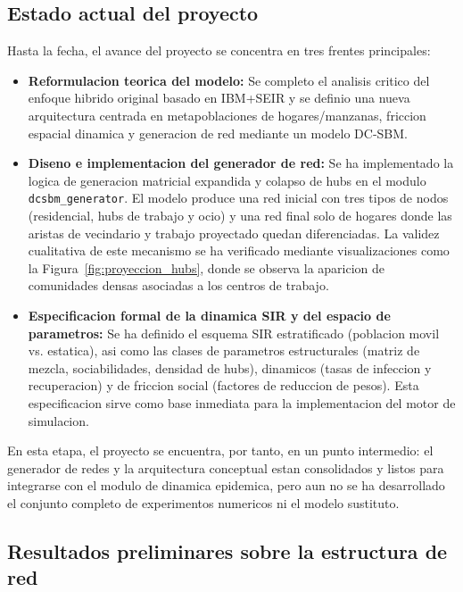 \subsection{Estado actual del proyecto}

Hasta la fecha, el avance del proyecto se concentra en tres frentes principales:

\begin{itemize}
    \item \textbf{Reformulacion teorica del modelo:} Se completo el analisis critico del enfoque hibrido original basado en IBM+SEIR y se definio una nueva arquitectura centrada en metapoblaciones de hogares/manzanas, friccion espacial dinamica y generacion de red mediante un modelo DC-SBM.
    \item \textbf{Diseno e implementacion del generador de red:} Se ha implementado la logica de generacion matricial expandida y colapso de hubs en el modulo \texttt{dcsbm\_generator}. El modelo produce una red inicial con tres tipos de nodos (residencial, hubs de trabajo y ocio) y una red final solo de hogares donde las aristas de vecindario y trabajo proyectado quedan diferenciadas. La validez cualitativa de este mecanismo se ha verificado mediante visualizaciones como la Figura~\ref{fig:proyeccion_hubs}, donde se observa la aparicion de comunidades densas asociadas a los centros de trabajo.
    \item \textbf{Especificacion formal de la dinamica SIR y del espacio de parametros:} Se ha definido el esquema SIR estratificado (poblacion movil vs. estatica), asi como las clases de parametros estructurales (matriz de mezcla, sociabilidades, densidad de hubs), dinamicos (tasas de infeccion y recuperacion) y de friccion social (factores de reduccion de pesos). Esta especificacion sirve como base inmediata para la implementacion del motor de simulacion.
\end{itemize}

En esta etapa, el proyecto se encuentra, por tanto, en un punto intermedio: el generador de redes y la arquitectura conceptual estan consolidados y listos para integrarse con el modulo de dinamica epidemica, pero aun no se ha desarrollado el conjunto completo de experimentos numericos ni el modelo sustituto.

\subsection{Resultados preliminares sobre la estructura de red}

